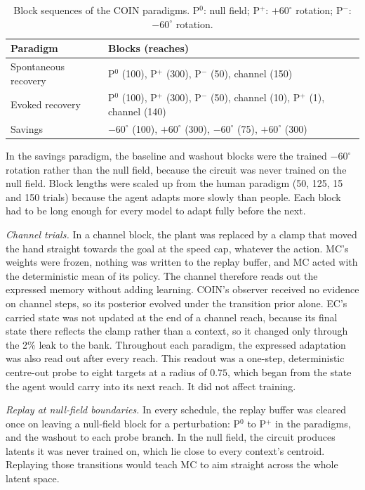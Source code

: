 \begin{table}[h]
\centering
\begin{tabular}{ll}
\hline
Paradigm & Blocks (reaches) \\
\hline
Spontaneous recovery & P$^{0}$ (100), P$^{+}$ (300), P$^{-}$ (50), channel (150) \\
Evoked recovery & P$^{0}$ (100), P$^{+}$ (300), P$^{-}$ (50), channel (10), P$^{+}$ (1), channel (140) \\
Savings & $-60^\circ$ (100), $+60^\circ$ (300), $-60^\circ$ (75), $+60^\circ$ (300) \\
\hline
\end{tabular}
\caption{Block sequences of the COIN paradigms. P$^{0}$: null field; P$^{+}$: $+60^\circ$ rotation; P$^{-}$: $-60^\circ$ rotation.}
\label{tab:paradigms}
\end{table}

In the savings paradigm, the baseline and washout blocks were the trained $-60^\circ$ rotation rather than the null field, because the circuit was never trained on the null field. Block lengths were scaled up from the human paradigm (50, 125, 15 and 150 trials) because the agent adapts more slowly than people. Each block had to be long enough for every model to adapt fully before the next.

\textit{Channel trials.} In a channel block, the plant was replaced by a clamp that moved the hand straight towards the goal at the speed cap, whatever the action. MC's weights were frozen, nothing was written to the replay buffer, and MC acted with the deterministic mean of its policy. The channel therefore reads out the expressed memory without adding learning. COIN's observer received no evidence on channel steps, so its posterior evolved under the transition prior alone. EC's carried state was not updated at the end of a channel reach, because its final state there reflects the clamp rather than a context, so it changed only through the 2\% leak to the bank. Throughout each paradigm, the expressed adaptation was also read out after every reach. This readout was a one-step, deterministic centre-out probe to eight targets at a radius of $0.75$, which began from the state the agent would carry into its next reach. It did not affect training.

\textit{Replay at null-field boundaries.} In every schedule, the replay buffer was cleared once on leaving a null-field block for a perturbation: P$^{0}$ to P$^{+}$ in the paradigms, and the washout to each probe branch. In the null field, the circuit produces latents it was never trained on, which lie close to every context's centroid. Replaying those transitions would teach MC to aim straight across the whole latent space.

